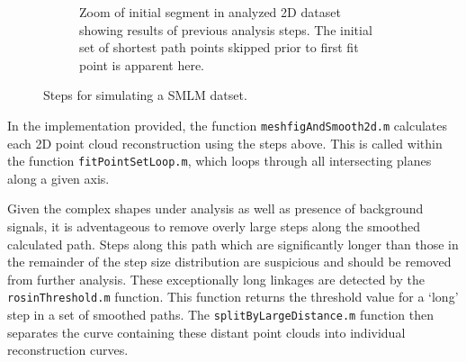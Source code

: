 \documentclass[10pt,a4paper]{article}
\begin{document}
\begin{figure}
\begin{subfigure}[b]{0.45\textwidth}
		\caption[Step4]{Zoom of initial segment in analyzed 2D dataset showing results of previous analysis steps. The initial set of shortest path points skipped prior to first fit point is apparent here.}
		\label{fig:fitStep4}
	\end{subfigure}
	
	\caption{Steps for simulating a SMLM datset.}
	\label{fig:smlmFit2D}
\end{figure}

In the implementation provided, the function \texttt{meshfigAndSmooth2d.m} calculates each 2D point cloud reconstruction using the steps above. This is called within the function \texttt{fitPointSetLoop.m}, which loops through all intersecting planes along a given axis.  

Given the complex shapes under analysis as well as presence of background signals, it is adventageous to remove overly large steps along the smoothed calculated path. Steps along this path which are significantly longer than those in the remainder of the step size distribution are suspicious and should be removed from further analysis.  These exceptionally long linkages are detected by the \texttt{rosinThreshold.m} function.  This function returns the threshold value for a `long' step in a set of smoothed paths.  The \texttt{splitByLargeDistance.m} function then separates the curve containing these distant point clouds into individual reconstruction curves.  
\end{document}
